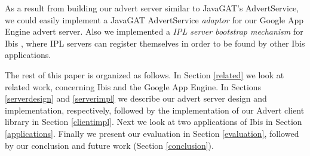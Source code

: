As a result from building our advert server similar to JavaGAT's AdvertService,
we could easily implement a JavaGAT AdvertService \emph{adaptor} for our Google
App Engine advert server. Also we implemented a \emph{IPL server bootstrap
mechanism} for Ibis \cite{ipl-www}, where IPL servers can register themselves in
order to be found by other Ibis applications.

The rest of this paper is organized as follows. In Section \ref{related} we look
at related work, concerning Ibis and the Google App Engine. In Sections
\ref{serverdesign} and \ref{serverimpl} we describe our advert server design and
implementation, respectively, followed by the implementation of our Advert client
library in Section \ref{clientimpl}. Next we look at two applications of Ibis in
Section \ref{applications}. Finally we present our evaluation in Section
\ref{evaluation}, followed by our conclusion and future work (Section
\ref{conclusion}).
